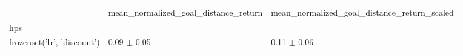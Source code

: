 \begin{tabular}{lll}
\toprule
 & mean_normalized_goal_distance_return & mean_normalized_goal_distance_return_scaled \\
hps &  &  \\
\midrule
frozenset({'lr', 'discount'}) & 0.09 $\pm$ 0.05 & 0.11 $\pm$ 0.06 \\
\bottomrule
\end{tabular}
